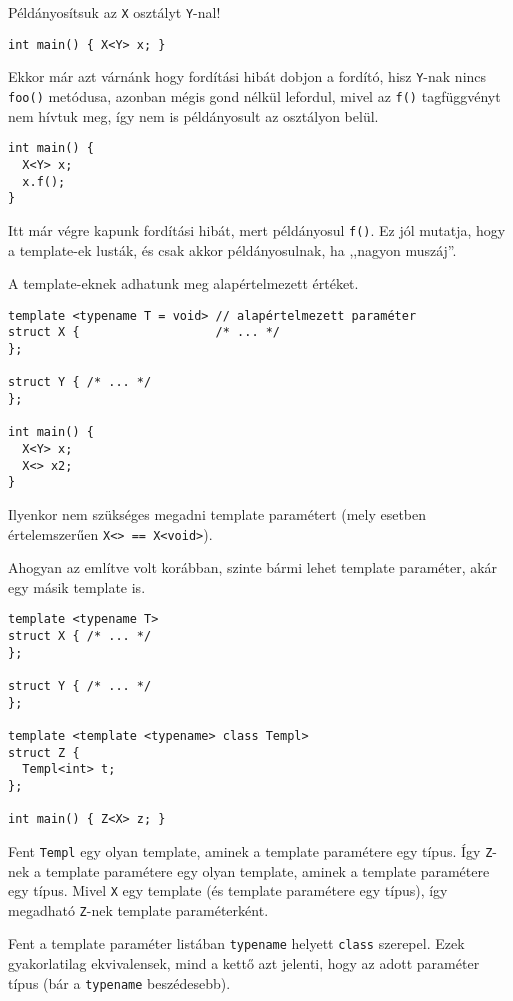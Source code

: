 \documentclass[../cpp_book/cpp_book.tex]{subfiles}
\begin{document}
	\smallskip
	Példányosítsuk az \texttt{X} osztályt \texttt{Y}-nal!
\begin{lstlisting}
int main() { X<Y> x; }
\end{lstlisting}
	Ekkor már azt várnánk hogy fordítási hibát dobjon a fordító, hisz \texttt{Y}-nak nincs \texttt{foo()} metódusa, azonban mégis gond nélkül lefordul, mivel az \texttt{f()} tagfüggvényt nem hívtuk meg, így nem is példányosult az osztályon belül.
	\begin{lstlisting}
int main() {
  X<Y> x;
  x.f();
}
	\end{lstlisting}
	Itt már végre kapunk fordítási hibát, mert példányosul \texttt{f()}. Ez jól mutatja, hogy a template-ek lusták, és csak akkor példányosulnak, ha ,,nagyon muszáj''.
	\medskip
	
	A template-eknek adhatunk meg alapértelmezett értéket.

\begin{lstlisting}
template <typename T = void> // alapértelmezett paraméter
struct X {                   /* ... */
};

struct Y { /* ... */
};

int main() {
  X<Y> x;
  X<> x2;
}
\end{lstlisting}
	Ilyenkor nem szükséges megadni template paramétert (mely esetben értelemszerűen \texttt{X<> == X<void>}). 
	
	\smallskip
	Ahogyan az említve volt korábban, szinte bármi lehet template paraméter, akár egy másik template is.

\begin{lstlisting}
template <typename T>
struct X { /* ... */
};

struct Y { /* ... */
};

template <template <typename> class Templ>
struct Z {
  Templ<int> t;
};

int main() { Z<X> z; }
\end{lstlisting}
	Fent \texttt{Templ} egy olyan template, aminek a template paramétere egy típus. Így \texttt{Z}-nek a template paramétere egy olyan template, aminek a template paramétere egy típus. Mivel \texttt{X} egy template (és template paramétere egy típus), így megadható \texttt{Z}-nek template paraméterként.
	\begin{note}
		Fent a template paraméter listában \texttt{typename} helyett \texttt{class} szerepel. Ezek gyakorlatilag ekvivalensek, mind a kettő azt jelenti, hogy az adott paraméter típus (bár a \texttt{typename} beszédesebb).
	\end{note}
	
\end{document}
